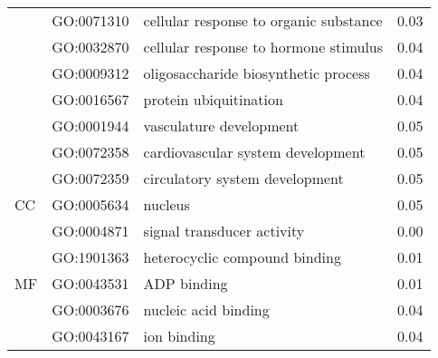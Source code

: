 \begin{longtable}{lllr}
   & GO:0071310 &       cellular response to organic substance &          0.03 \\
   & GO:0032870 &        cellular response to hormone stimulus &          0.04 \\
   & GO:0009312 &         oligosaccharide biosynthetic process &          0.04 \\
   & GO:0016567 &                       protein ubiquitination &          0.04 \\
   & GO:0001944 &                      vasculature development &          0.05 \\
   & GO:0072358 &            cardiovascular system development &          0.05 \\
   & GO:0072359 &               circulatory system development &          0.05 \\
\cline{1-4}
CC & GO:0005634 &                                      nucleus &          0.05 \\
\multirow{5}{*}{MF} & GO:0004871 &                   signal transducer activity &          0.00 \\
   & GO:1901363 &                heterocyclic compound binding &          0.01 \\
   & GO:0043531 &                                  ADP binding &          0.01 \\
   & GO:0003676 &                         nucleic acid binding &          0.04 \\
   & GO:0043167 &                                  ion binding &          0.04 \\
\end{longtable}
